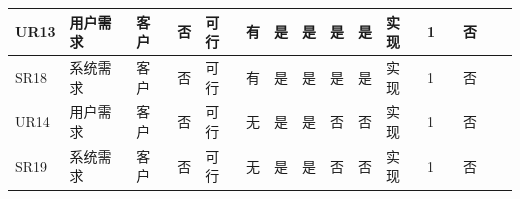 \documentclass[a4paper]{ctexart}
\begin{document}
{\begin{longtable}{|P{4em}|P{4em}|P{2em}|P{2em}|P{2em}|P{1em}|P{3em}|P{3em}|P{4em}|P{4em}|P{2em}|P{2em}|P{3em}|P{3em}|P{4em}|P{4em}|}
  \hline
  UR13                                         & 用户需求                            & 客户                                         & 否                                            & 可行                    & 有   & 是           & 是           & 是             & 是             & 实现     & 1      &            & 否           &                 &                        \\
  \hline
  SR18                                         & 系统需求                            & 客户                                         & 否                                            & 可行                    & 有   & 是           & 是           & 是             & 是             & 实现     & 1      &            & 否           &                 &                        \\
  \hline
  UR14                                         & 用户需求                            & 客户                                         & 否                                            & 可行                    & 无   & 是           & 是           & 否             & 否             & 实现     & 1      &            & 否           &                 &                        \\
  \hline
  SR19                                         & 系统需求                            & 客户                                         & 否                                            & 可行                    & 无   & 是           & 是           & 否             & 否             & 实现     & 1      &            & 否           &                 &                        \\
  \end{longtable}
  }
\end{document}
